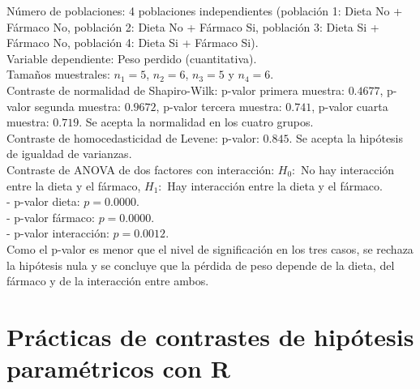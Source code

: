 \documentclass[
  a4paper,
]{scrreport}
\theoremstyle{definition}
\theoremstyle{remark}
\begin{document}
\begin{tcolorbox}[enhanced jigsaw, breakable, opacityback=0, colbacktitle=quarto-callout-tip-color!10!white, colframe=quarto-callout-tip-color-frame, left=2mm, titlerule=0mm, coltitle=black, colback=white, bottomtitle=1mm, toptitle=1mm, opacitybacktitle=0.6, title=\textcolor{quarto-callout-tip-color}{\faLightbulb}\hspace{0.5em}{Solución}, leftrule=.75mm, bottomrule=.15mm, toprule=.15mm, rightrule=.15mm, arc=.35mm]

Número de poblaciones: 4 poblaciones independientes (población 1: Dieta
No + Fármaco No, población 2: Dieta No + Fármaco Si, población 3: Dieta
Si + Fármaco No, población 4: Dieta Si + Fármaco Si).\\
Variable dependiente: Peso perdido (cuantitativa).\\
Tamaños muestrales: \(n_1=5\), \(n_2=6\), \(n_3=5\) y \(n_4=6\).\\
Contraste de normalidad de Shapiro-Wilk: p-valor primera muestra:
\(0.4677\), p-valor segunda muestra: \(0.9672\), p-valor tercera
muestra: \(0.741\), p-valor cuarta muestra: \(0.719\). Se acepta la
normalidad en los cuatro grupos.\\
Contraste de homocedasticidad de Levene: p-valor: \(0.845\). Se acepta
la hipótesis de igualdad de varianzas.\\
Contraste de ANOVA de dos factores con interacción: \(H_0:\) No hay
interacción entre la dieta y el fármaco, \(H_1:\) Hay interacción entre
la dieta y el fármaco.\\
- p-valor dieta: \(p=0.0000\).\\
- p-valor fármaco: \(p=0.0000\).\\
- p-valor interacción: \(p=0.0012\).\\
Como el p-valor es menor que el nivel de significación en los tres
casos, se rechaza la hipótesis nula y se concluye que la pérdida de peso
depende de la dieta, del fármaco y de la interacción entre ambos.

\end{tcolorbox}


\chapter{Prácticas de contrastes de hipótesis paramétricos con
R}\label{pruxe1cticas-de-contrastes-de-hipuxf3tesis-paramuxe9tricos-con-r}
\end{document}

